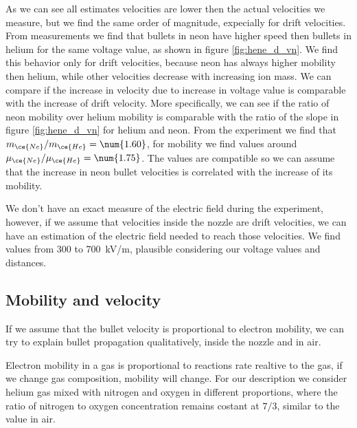  
As we can see all estimates velocities are lower then the actual velocities we measure, but we find the same order of magnitude, expecially for drift velocities.
From measurements we find that bullets in neon have higher speed then bullets in helium for the same voltage value, as shown in figure \ref{fig:hene_d_vn}. We find this behavior only for drift velocities, because neon has always higher mobility then helium, while other velocities decrease with increasing ion mass. We can compare if the increase in velocity due to increase in voltage value is comparable with the increase of drift velocity. More specifically, we can see if the ratio of neon mobility over helium mobility is comparable with the ratio of the slope in figure \ref{fig:hene_d_vn} for helium and neon. From the experiment we find that $m_{\ce{Ne}}/m_{\ce{He}} = \num{1.60}$, for mobility we find values around $\mu_{\ce{Ne}}/\mu_{\ce{He}} = \num{1.75}$. The values are compatible so we can assume that the increase in neon bullet velocities is correlated with the increase of its mobility.

We don't have an exact measure of the electric field during the experiment, however, if we assume that velocities inside the nozzle are drift velocities, we can have an estimation of the electric field needed to reach those velocities. We find values from \num{300} to \SI{700}{\kilo\volt/\meter}, plausible considering our voltage values and distances.

\subsection{Mobility and velocity}
If we assume that the bullet velocity is proportional to electron mobility, we can try to explain bullet propagation qualitatively, inside the nozzle and in air.

Electron mobility in a gas is proportional to reactions rate realtive to the gas, if we change gas composition, mobility will change. For our description we consider helium gas mixed with nitrogen and oxygen in different proportions, where the ratio of nitrogen to oxygen concentration remains costant at $7/3$, similar to the value in air.

